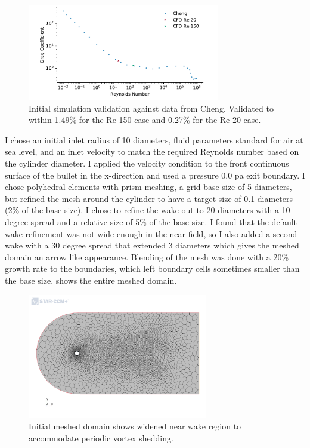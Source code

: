 \documentclass[10pt,english]{article}
\begin{document}
\begin{figure}[htbp]
\centering
\includegraphics[trim={.0cm .25cm .0cm 0cm},clip,width=0.75\textwidth]{validation}
\vspace{-5pt}
\caption{Initial simulation validation against data from Cheng. Validated to within 1.49\% for the Re 150 case and 0.27\% for the Re 20 case. }
\label{f:val1}
\end{figure}

 I chose an initial inlet radius of 10 diameters, fluid parameters standard for air at sea level, and an inlet velocity to match the required Reynolds number based on the cylinder diameter.  I applied the velocity condition to the front continuous surface of the bullet in the x-direction and used a pressure 0.0 pa exit boundary.  I chose polyhedral elements with prism meshing, a grid base size of 5 diameters, but refined the mesh around the cylinder to have a target size of 0.1 diameters (2\% of the base size).  I chose to refine the wake out to 20 diameters with a 10 degree spread and a relative size of 5\% of the base size.  I found that the default wake refinement was not wide enough in the near-field, so I also added a second wake with a 30 degree spread that extended 3 diameters which gives the meshed domain an arrow like appearance.  Blending of the mesh was done with a 20\% growth rate to the boundaries, which left boundary cells sometimes smaller than the base size.   shows the entire meshed domain.
 
 \begin{figure}[h]
\centering
\includegraphics[trim={1.5cm 5cm 1.0cm 3cm},clip,width=0.7\textwidth]{cylinder_2_05_MeshScene2.png}
\vspace{-5pt}
\caption{Initial meshed domain shows widened near wake region to accommodate periodic vortex shedding. }
\label{f:mesh05_1}
\end{figure}
\end{document}
